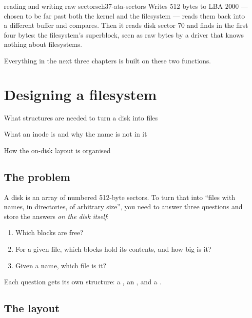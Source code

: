\begin{recipe}{reading and writing raw sectors}{ch37-ata-sectors}
Writes 512 bytes to LBA 2000 --- chosen to be far past both the kernel and the filesystem --- reads
them back into a different buffer and compares. Then it reads disk sector 70 and finds
 in the first four bytes: the filesystem's superblock, seen as raw bytes by a driver
that knows nothing about filesystems.

Everything in the next three chapters is built on these two functions.
\end{recipe}

\chapter{Designing a filesystem}

\begin{goals}
  \item What structures are needed to turn a disk into files
  \item What an inode is and why the name is not in it
  \item How the on-disk layout is organised
\end{goals}

\section{The problem}

A disk is an array of numbered 512-byte sectors. To turn that into ``files with names, in
directories, of arbitrary size'', you need to answer three questions and store the answers
\emph{on the disk itself}:

\begin{enumerate}
  \item Which blocks are free?
  \item For a given file, which blocks hold its contents, and how big is it?
  \item Given a name, which file is it?
\end{enumerate}

Each question gets its own structure: a , an , and a .

\section{The layout}

